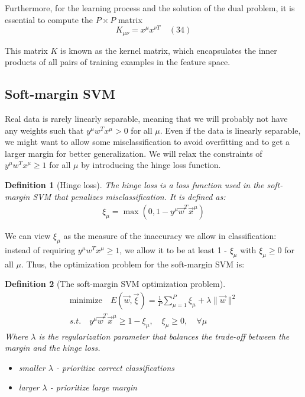 \documentclass[11pt]{book} %
\newtheorem{definition}{Definition}[section]
\begin{document}
Furthermore, for the learning process and the solution of the dual problem, it is essential to compute the \( P \times P \) matrix
\begin{equation}
    K_{\mu \nu} = x^{\mu} x^{\nu T} \quad (34)
\end{equation}

This matrix \( K \) is known as the kernel matrix, 
which encapsulates the inner products of all pairs of training examples in the feature space. 


%
%


\subsection{Soft-margin SVM}

Real data is rarely linearly separable, meaning that we will probably not have any weights such that $y^{\mu}w^T x^{\mu} > 0$ for all $\mu$.
Even if the data is linearly separable, we might want to allow some misclassification to avoid overfitting and to get a larger margin for better generalization.
We will relax the constraints of $y^{\mu}w^T x^{\mu} \geq 1$ for all $\mu$ by introducing the hinge loss function.

\begin{definition}[Hinge loss]
    The hinge loss is a loss function used in the soft-margin SVM that penalizes misclassification. It is defined as:
    \begin{align}
        \xi _{\mu} = \max(0, 1 - y^\mu \vec{w}^T \vec{x}^\mu)
    \end{align}   
\end{definition}

We can view $\xi _{\mu}$ as the measure of the inaccuracy we allow in classification: instead of requiring $y^{\mu}w^T x^{\mu} \geq 1$, 
we allow it to be at least 1 - $\xi _{\mu}$ with $\xi _{\mu} \geq 0$ for all $\mu$.
Thus, the optimization problem for the soft-margin SVM is:

\begin{definition}[The soft-margin SVM optimization problem]
    \begin{align*}
        \text{minimize} \quad E(\vec{w}, \vec{\xi}) = \frac{1}{P} \sum_{\mu=1}^P \xi _{\mu} + \lambda \lVert \vec{w} \rVert^2    \\
        s.t. \quad y^{\mu} \vec{w}^T \vec{x}^{\mu} \geq 1 - \xi _{\mu}, \quad \xi _{\mu} \geq 0, \quad \forall \mu
    \end{align*}
    Where $\lambda$ is the regularization parameter that balances the trade-off between the margin and the hinge loss.
    \begin{itemize}
        \item smaller $\lambda$ - prioritize correct classifications
        \item larger $\lambda$ - prioritize large margin
    \end{itemize}
\end{definition}
\end{document}
